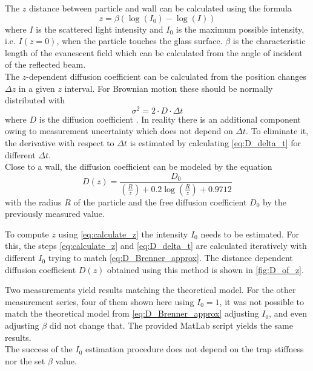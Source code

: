 \documentclass[
    twoside=false,
    twocolumn=true,
    fontsize=11pt,
]{scrarticle}
\begin{document}
The $z$ distance between particle and wall can be calculated using the formula \cite{instructions}
\begin{equation}
 \label{eq:calculate_z}
 z = \beta \left(\log(I_0) - \log(I)\right)
\end{equation}
where $I$ is the scattered light intensity and $I_0$ is the maximum possible intensity, i.e. $I(z=0)$, when the particle touches the glass surface. $\beta$ is the characteristic length of the evanescent field which can be calculated from the angle of incident of the reflected beam.\\
The $z$-dependent diffusion coefficient can be calculated from the position changes $\Delta z$ in a given $z$ interval. For Brownian motion these should be normally distributed with
\begin{equation}
\label{eq:D_delta_t}
 \sigma^2 = 2 \cdot D \cdot \Delta t
\end{equation}
where $D$ is the diffusion coefficient \cite{instructions}. In reality there is an additional component owing to measurement uncertainty which does not depend on $\Delta t$. To eliminate it, the derivative with respect to $\Delta t$ is estimated by calculating \autoref{eq:D_delta_t} for different $\Delta t$.\\
Close to a wall, the diffusion coefficient can be modeled \cite{instructions} by the equation
\begin{equation}
 \label{eq:D_Brenner_approx}
 D(z) = \frac{D_0}{\left(\frac{R}{z}\right) + 0.2 \log\left(\frac{R}{z}\right) + 0.9712}
\end{equation}
with the radius $R$ of the particle and the free diffusion coefficient $D_0$ by the previously measured value.

To compute $z$ using \autoref{eq:calculate_z} the intensity $I_0$ needs to be estimated.
For this, the steps \autoref{eq:calculate_z} and \autoref{eq:D_delta_t} are calculated iteratively with different $I_0$ trying to match \autoref{eq:D_Brenner_approx}. 
The distance dependent diffusion coefficient $D(z)$ obtained using this method is shown in \autoref{fig:D_of_z}. 

Two measurements yield results matching the theoretical model.
For the other measurement series, four of them shown here using $I_0=1$, it was not possible to match the theoretical model from \autoref{eq:D_Brenner_approx} adjusting $I_0$, and even adjusting $\beta$ did not change that. 
The provided MatLab script yields the same results.\\
The success of the $I_0$ estimation procedure does not depend on the trap stiffness nor the set $\beta$ value.
\end{document}
